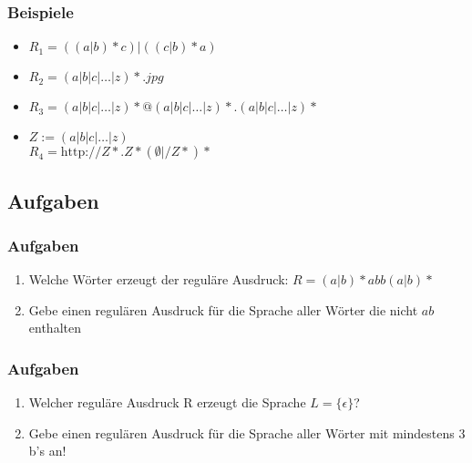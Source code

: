 \begin{frame}
  \frametitle{Beispiele}
	\begin{exampleblock}{}
    \begin{itemize}
      \item $R_1 = ({(a|b)*}c)|({(c|b)*}a)$
      \item $R_2 = {(a|b|c|\dots|z)*}.jpg$
      \item $R_3 = {(a|b|c|\dots|z)*}@{(a|b|c|\dots|z)*}.{(a|b|c|\dots|z)*}$
      \item $Z := (a|b|c|\dots|z)$\\
            $R_4 = \text{http://}{Z*}.{Z*}(\emptyset|/Z*)*$
    \end{itemize}
	\end{exampleblock}
\end{frame}

\subsection{Aufgaben}
\begin{frame}
  \frametitle{Aufgaben}
  \begin{enumerate}
		\item Welche Wörter erzeugt der reguläre Ausdruck: $R=(a|b)*abb(a|b)*$\\
		\item Gebe einen regulären Ausdruck für die Sprache aller Wörter die nicht $ab$ enthalten\\
  \end{enumerate}
\end{frame}

\begin{frame}
  \frametitle{Aufgaben}
  \begin{enumerate}
		\item Welcher reguläre Ausdruck R erzeugt die Sprache $L=\{\epsilon\}$?
		\item Gebe einen regulären Ausdruck für die Sprache aller Wörter mit mindestens 3 b's an!\\
	\end{enumerate}
\end{frame}


